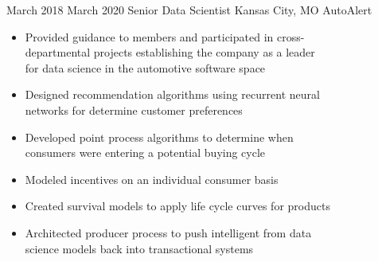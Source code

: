 \Experience
{March 2018}
{March 2020}
{Senior Data Scientist}
{Kansas City, MO}
{AutoAlert}
{\begin{itemize}
     \item Provided guidance to members and participated in cross-
     \\ departmental projects establishing the company as a leader
     \\ for data science in the automotive software space
     \item Designed recommendation algorithms using recurrent neural
     \\ networks for determine customer preferences
     \item Developed point process algorithms to determine when
     \\ consumers were entering a potential buying cycle
     \item Modeled incentives on an individual consumer basis
     \item Created survival models to apply life cycle curves for products
     \item Architected producer process to push intelligent from data
     \\ science models back into transactional systems
\end{itemize}}

\vspace*{0.05 in}


